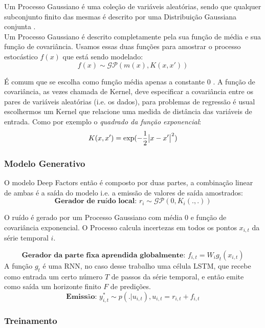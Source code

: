 Um Processo Gaussiano é uma coleção de variáveis aleatórias,
sendo que qualquer subconjunto finito das mesmas é descrito por uma Distribuição Gaussiana conjunta \cite{gpml}. \\

Um Processo Gaussiano é descrito completamente pela sua função de média e sua função de covariância. Usamos essas duas funções para amostrar o processo estocástico $f(x)$ que está sendo modelado: \\

\[
f(x) \sim \mathcal{GP}( m(x), K(x,x'))
\]

É comum que se escolha como função média apenas a constante 0 \cite{gpml}.  A função de covariância, as vezes chamada de Kernel, deve especificar a covariância entre os pares de variáveis aleatórias (i.e. os dados), para problemas de regressão é usual escolhermos um Kernel que relacione uma medida de distância das variáveis de entrada. Como por exemplo o \textit{quadrado da função exponencial}: \\

\[
  K(x,x') = \exp(-\frac{1}{2}\abs{x - x'}^2)
\]


\subsubsection{Modelo Generativo}

O modelo Deep Factors então é composto por duas partes, a combinação linear de ambas é a saída do modelo i.e. a emissão de valores de saída amostrados: \\


\[
    \textbf{Gerador de ruído local: }  r_i \sim \mathcal{GP} (0, K_i(.,.))
\]

O ruído é gerado por um Processo Gaussiano com média 0 e função de covariância exponencial. O Processo calcula incertezas em todos os pontos $x_{i,t}$ da série temporal $i$.
  
\[
  \textbf{Gerador da parte fixa aprendida globalmente: }  f_{i,t} = W_ig_t(x_{i,t})
\]
A função $g_t$ é uma RNN, no caso desse trabalho uma célula LSTM, que recebe como entrada um certo número $T$ de passos da série temporal, e então emite como saída um horizonte finito $F$ de predições.
\[
  \textbf{Emissão: }  y^*_{i,t} \sim p(. | u_{i,t}) , u_{i,t} = r_{i,t} + f_{i,t}  
\]

\subsubsection{Treinamento}

